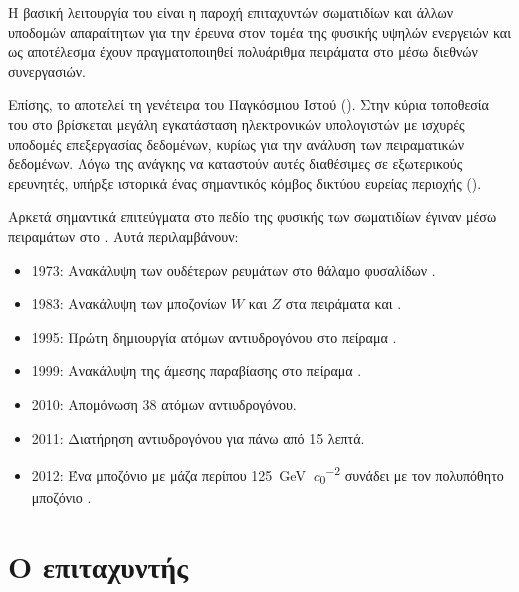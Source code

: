 Η βασική λειτουργία του  είναι η παροχή επιταχυντών σωματιδίων και άλλων υποδομών απαραίτητων για την έρευνα στον τομέα της φυσικής υψηλών ενεργειών και ως αποτέλεσμα έχουν πραγματοποιηθεί πολυάριθμα πειράματα στο  μέσω διεθνών συνεργασιών.

Επίσης, το  αποτελεί τη γενέτειρα του Παγκόσμιου Ιστού (). Στην κύρια τοποθεσία του στο  βρίσκεται μεγάλη εγκατάσταση ηλεκτρονικών υπολογιστών με ισχυρές υποδομές επεξεργασίας δεδομένων, κυρίως για την ανάλυση των πειραματικών δεδομένων. 
Λόγω της ανάγκης να καταστούν αυτές διαθέσιμες σε εξωτερικούς ερευνητές, υπήρξε ιστορικά ένας σημαντικός κόμβος δικτύου ευρείας περιοχής ().

Αρκετά σημαντικά επιτεύγματα στο πεδίο της φυσικής των σωματιδίων έγιναν μέσω πειραμάτων στο . Αυτά περιλαμβάνουν:
\begin{itemize}
\item 1973: Ανακάλυψη των ουδέτερων ρευμάτων στο θάλαμο φυσαλίδων .
\item 1983: Ανακάλυψη των μποζονίων $W$ και $Z$ στα πειράματα  και .
\item 1995: Πρώτη δημιουργία ατόμων αντιυδρογόνου στο πείραμα .
\item 1999: Ανακάλυψη της άμεσης παραβίασης  στο πείραμα .
\item 2010: Απομόνωση 38 ατόμων αντιυδρογόνου.
\item 2011: Διατήρηση αντιυδρογόνου για πάνω από 15 λεπτά.
\item 2012: Ένα μποζόνιο με μάζα περίπου \SI[per-mode = symbol]{125}{\GeV \per  \clight \squared} συνάδει με τον πολυπόθητο μποζόνιο .
\end{itemize}


\section{Ο επιταχυντής }


